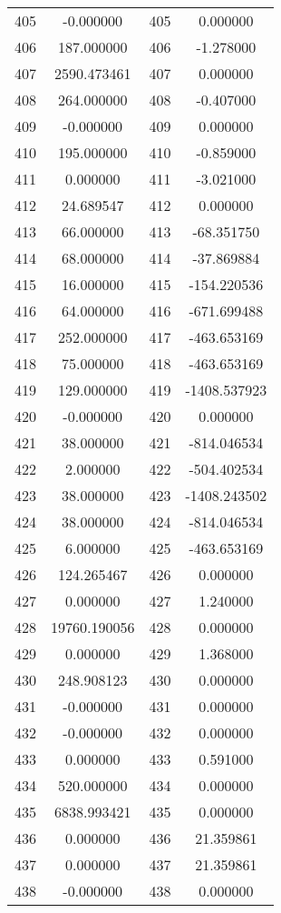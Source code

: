 \documentclass[12pt]{article}
\begin{document}
\begin{longtable}{@{}cccc@{}}
405 & -0.000000 & 405 & 0.000000 \\
406 & 187.000000 & 406 & -1.278000 \\
407 & 2590.473461 & 407 & 0.000000 \\
408 & 264.000000 & 408 & -0.407000 \\
409 & -0.000000 & 409 & 0.000000 \\
410 & 195.000000 & 410 & -0.859000 \\
411 & 0.000000 & 411 & -3.021000 \\
412 & 24.689547 & 412 & 0.000000 \\
413 & 66.000000 & 413 & -68.351750 \\
414 & 68.000000 & 414 & -37.869884 \\
415 & 16.000000 & 415 & -154.220536 \\
416 & 64.000000 & 416 & -671.699488 \\
417 & 252.000000 & 417 & -463.653169 \\
418 & 75.000000 & 418 & -463.653169 \\
419 & 129.000000 & 419 & -1408.537923 \\
420 & -0.000000 & 420 & 0.000000 \\
421 & 38.000000 & 421 & -814.046534 \\
422 & 2.000000 & 422 & -504.402534 \\
423 & 38.000000 & 423 & -1408.243502 \\
424 & 38.000000 & 424 & -814.046534 \\
425 & 6.000000 & 425 & -463.653169 \\
426 & 124.265467 & 426 & 0.000000 \\
427 & 0.000000 & 427 & 1.240000 \\
428 & 19760.190056 & 428 & 0.000000 \\
429 & 0.000000 & 429 & 1.368000 \\
430 & 248.908123 & 430 & 0.000000 \\
431 & -0.000000 & 431 & 0.000000 \\
432 & -0.000000 & 432 & 0.000000 \\
433 & 0.000000 & 433 & 0.591000 \\
434 & 520.000000 & 434 & 0.000000 \\
435 & 6838.993421 & 435 & 0.000000 \\
436 & 0.000000 & 436 & 21.359861 \\
437 & 0.000000 & 437 & 21.359861 \\
438 & -0.000000 & 438 & 0.000000 \\

\end{longtable}
\end{document}
